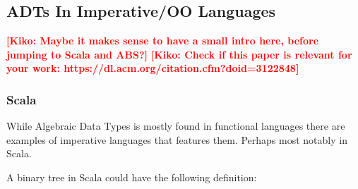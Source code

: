 \documentclass[10pt]{report}
\newcommand{\KIKO}[1]{\textcolor{red}{\textbf{[Kiko: #1]}}}
\begin{document}


\subsection{ADTs In Imperative/OO Languages}
\KIKO{Maybe it makes sense to have a small intro here, before jumping to Scala and ABS?}
\KIKO{Check if this paper is relevant for your work: https://dl.acm.org/citation.cfm?doid=3122848}


\subsubsection{Scala}


\par{While Algebraic Data Types is mostly found in functional languages there are examples of imperative languages that features them. Perhaps most notably in Scala.}
\par{A binary tree in Scala could have the following definition:}
\end{document}
